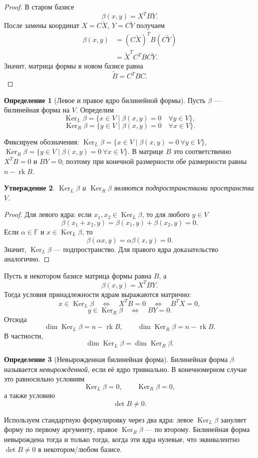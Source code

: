 \documentclass[12pt,a4paper]{article}
\theoremstyle{definition}
\newtheorem{definition}{Определение}[section]
\theoremstyle{plain}
\newtheorem{proposition}[definition]{Утверждение}
\theoremstyle{remark}
\newenvironment{knowledgefix}{\begin{clarifybox}}{\end{clarifybox}}
\newcommand{\F}{\mathbb{F}}
\newcommand{\Ker}{\operatorname{Ker}}
\newcommand{\rk}{\operatorname{rk}}
\begin{document}
\begin{proof}
В старом базисе
\[
    \beta(x,y)=X^TBY.
\]
После замены координат $X=C\widetilde X$, $Y=C\widetilde Y$ получаем
\[
\begin{aligned}
    \beta(x,y)
    &=(C\widetilde X)^T B(C\widetilde Y) \\
    &=\widetilde X^T C^TBC\widetilde Y.
\end{aligned}
\]
Значит, матрица формы в новом базисе равна
\[
    \widetilde B=C^TBC.
\]
\end{proof}


\begin{definition}[Левое и правое ядро билинейной формы]
Пусть $\beta$ --- билинейная форма на $V$.
Определим
\[
    \Ker_L\beta=\{x\in V\mid \beta(x,y)=0\quad \forall y\in V\},
\]
\[
    \Ker_R\beta=\{y\in V\mid \beta(x,y)=0\quad \forall x\in V\}.
\]
\begin{knowledgefix}
Фиксируем обозначения: \(\Ker_L\beta=\{x\in V\mid \beta(x,y)=0\ \forall y\in V\}\), \(\Ker_R\beta=\{y\in V\mid \beta(x,y)=0\ \forall x\in V\}\). В матрице \(B\) это соответственно \(X^TB=0\) и \(BY=0\); поэтому при конечной размерности обе размерности равны \(n-\rk B\).
\end{knowledgefix}
\end{definition}

\begin{proposition}
$\Ker_L\beta$ и $\Ker_R\beta$ являются подпространствами пространства $V$.
\end{proposition}

\begin{proof}
Для левого ядра:
если $x_1,x_2\in\Ker_L\beta$, то для любого $y\in V$
\[
    \beta(x_1+x_2,y)=\beta(x_1,y)+\beta(x_2,y)=0.
\]
Если $\alpha\in\F$ и $x\in\Ker_L\beta$, то
\[
    \beta(\alpha x,y)=\alpha\beta(x,y)=0.
\]
Значит, $\Ker_L\beta$ --- подпространство. Для правого ядра доказательство аналогично.
\end{proof}

Пусть в некотором базисе матрица формы равна $B$, а
\[
    \beta(x,y)=X^TBY.
\]
Тогда условия принадлежности ядрам выражаются матрично:
\[
    x\in\Ker_L\beta
    \quad\Longleftrightarrow\quad
    X^TB=0
    \quad\Longleftrightarrow\quad
    B^TX=0,
\]
\[
    y\in\Ker_R\beta
    \quad\Longleftrightarrow\quad
    BY=0.
\]
Отсюда
\[
    \dim \Ker_L\beta=n-\rk B,
    \qquad
    \dim \Ker_R\beta=n-\rk B.
\]
В частности,
\[
    \dim \Ker_L\beta=\dim \Ker_R\beta.
\]

\begin{definition}[Невырожденная билинейная форма]
Билинейная форма $\beta$ называется \emph{невырожденной}, если её ядро тривиально.
В конечномерном случае это равносильно условиям
\[
    \Ker_L\beta=0,
    \qquad
    \Ker_R\beta=0,
\]
а также условию
\[
    \det B\ne 0.
\]
\begin{knowledgefix}
Используем стандартную формулировку через два ядра: левое \(\Ker_L\beta\) зануляет форму по первому аргументу, правое \(\Ker_R\beta\) — по второму. Билинейная форма невырождена тогда и только тогда, когда эти ядра нулевые, что эквивалентно \(\det B\ne0\) в некотором/любом базисе.
\end{knowledgefix}
\end{definition}
\end{document}

